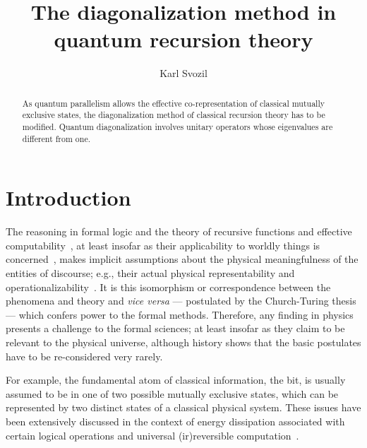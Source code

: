 \documentclass[prl,amsfonts,amsmath,showpacs,showkeys,preprint]{revtex4}
\begin{document}



\title{The diagonalization method in quantum recursion theory}

\author{Karl Svozil}


\begin{abstract}
As quantum parallelism allows the effective co-representation of classical mutually exclusive states, the diagonalization method of classical recursion theory has to be modified. Quantum diagonalization involves unitary operators whose eigenvalues are different from one.
\end{abstract}


\maketitle

\section{Introduction}

The reasoning in formal logic and the theory of recursive functions and
effective computability~\cite{rogers1,davis,Barwise-handbook-logic,enderton72,odi:89,Boolos-07},
at least insofar as their applicability to worldly things is concerned~\cite{landauer},
makes implicit assumptions about the physical meaningfulness  of the entities of
discourse; e.g., their actual physical representability and operationalizability~\cite{bridgman}.
It is this isomorphism or correspondence between the phenomena and  theory and {\it vice versa}
--- postulated by the Church-Turing thesis~\cite{Olszewski-06} ---
which confers power to the formal methods.
Therefore, any finding in physics presents a challenge to the formal sciences; at least
insofar as they claim to be relevant to the physical universe,
although history shows that the basic postulates have to be re-considered very rarely.


For example, the fundamental atom of classical information, the bit,
is usually assumed to be in one of two possible mutually exclusive states, which
can be represented by two distinct states of a classical physical system.
These issues have been extensively discussed in the context of energy dissipation associated
with certain logical operations and
universal (ir)reversible computation~\cite{fred-tof-82,maxwell-demon,feynman,feynman-computation}.
\end{document}

